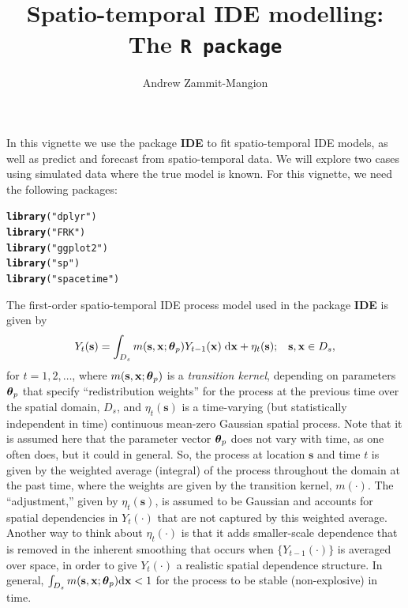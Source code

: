 \documentclass{article}\usepackage[]{graphicx}\usepackage[]{color}
\title{Spatio-temporal IDE modelling: The \tt{R} package}
\author{Andrew Zammit-Mangion}
\makeatletter
\newcommand{\hlstr}[1]{\textcolor[rgb]{0.192,0.494,0.8}{#1}}%
\newcommand{\hlstd}[1]{\textcolor[rgb]{0.345,0.345,0.345}{#1}}%
\newcommand{\hlkwd}[1]{\textcolor[rgb]{0.737,0.353,0.396}{\textbf{#1}}}%
\newenvironment{kframe}{%
 \def\at@end@of@kframe{}%
 \ifinner\ifhmode%
  \def\at@end@of@kframe{\end{minipage}}%
  \begin{minipage}{\columnwidth}%
 \fi\fi%
 \def\FrameCommand##1{\hskip\@totalleftmargin \hskip-\fboxsep
 \colorbox{shadecolor}{##1}\hskip-\fboxsep
     \hskip-\linewidth \hskip-\@totalleftmargin \hskip\columnwidth}%
 \MakeFramed {\advance\hsize-\width
   \@totalleftmargin\z@ \linewidth\hsize
   \@setminipage}}%
 {\par\unskip\endMakeFramed%
 \at@end@of@kframe}
\newenvironment{knitrout}{}{} %
\def\bs{\mathbf{s}}
\def\bx{\mathbf{x}}
\newcommand{\intd}{\textrm{d}}
\newcommand{\bftheta}{\mbox{\boldmath $\theta$}}
\makeatother
\begin{document}

\maketitle


In this vignette we use the package {\bf IDE} to fit spatio-temporal IDE models, as well as predict and forecast from spatio-temporal data. We will explore two cases using simulated data where the true model is known. For this vignette, we need the following packages:

\begin{knitrout}
\color{fgcolor}\begin{kframe}
\begin{alltt}
\hlkwd{library}\hlstd{(}\hlstr{"dplyr"}\hlstd{)}
\hlkwd{library}\hlstd{(}\hlstr{"FRK"}\hlstd{)}
\hlkwd{library}\hlstd{(}\hlstr{"ggplot2"}\hlstd{)}
\hlkwd{library}\hlstd{(}\hlstr{"sp"}\hlstd{)}
\hlkwd{library}\hlstd{(}\hlstr{"spacetime"}\hlstd{)}
\end{alltt}
\end{kframe}
\end{knitrout}




The first-order spatio-temporal IDE process model used in the package {\bf IDE} is given by
\begin{equation}
Y_t(\bs) = \int_{D_s} m(\bs,\bx;\bftheta_p) Y_{t-1}(\bx) \; \intd \bx  + \eta_t(\bs); \;\;\; \bs,\bx \in D_s,
\label{eq:linearIDE}
\end{equation}
for $t=1,2,\ldots$, where $m(\bs,\bx;\bftheta_p)$ is a {\it transition kernel}, depending on parameters $\bftheta_p$ that specify ``redistribution weights'' for the process at the previous time over the spatial domain, $D_s$, and $\eta_t(\bs)$ is a time-varying (but statistically independent in time) continuous mean-zero Gaussian spatial process.   Note that it is assumed here that the parameter vector $\bftheta_p$ does not vary with time, as one often does, but it could in general.  So, the process at location $\bs$ and time $t$ is given by the weighted average (integral) of the process throughout the domain at the past time, where the weights are given by the transition kernel, $m(\cdot)$.  The ``adjustment,'' given by $\eta_t(\bs)$, is assumed to be Gaussian and accounts for spatial dependencies in $Y_t(\cdot)$ that are not captured by this weighted average. Another way to think about $\eta_t(\cdot)$ is that it adds smaller-scale dependence that is removed in the inherent smoothing that occurs when $\{Y_{t-1}(\cdot)\}$ is averaged over space, in order to give $Y_t(\cdot)$ a realistic spatial dependence structure. In general, $\int_{D_s} m(\bs,\bx;\bftheta_p) \intd \bx < 1$ for the process to be stable (non-explosive) in time.
\end{document}
